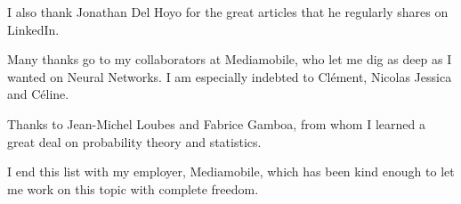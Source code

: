 I also thank Jonathan Del Hoyo for the great articles that he regularly shares on LinkedIn.

\vspace{0.2cm}

Many thanks go to my collaborators at Mediamobile, who let me dig as deep as I wanted on Neural Networks. I am especially indebted to Clément, Nicolas Jessica and Céline. 

\vspace{0.2cm}

Thanks to Jean-Michel Loubes and Fabrice Gamboa, from whom I learned a great deal on probability theory and statistics.

\vspace{0.2cm}

I end this list with my employer, Mediamobile, which has been kind enough to let me work on this topic with complete freedom.

